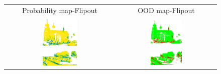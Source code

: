     \begin{figure}[h!]
        \centering
        \begin{tabular}{cc}
            Probability map-Flipout & OOD map-Flipout \\
            \includegraphics[width=0.33\textwidth, height=0.18\textheight]{images/ood_imgs/fout_sem3d/fout_prob_1.pdf}& 
            \includegraphics[width=0.33\textwidth, height=0.18\textheight]{images/ood_imgs/fout_sem3d/fout_ood_auroc_1.pdf}\\

            \includegraphics[width=0.33\textwidth, height=0.18\textheight]{images/ood_imgs/fout_sem3d/fout_prob_2.pdf}& 
            \includegraphics[width=0.33\textwidth, height=0.18\textheight]{images/ood_imgs/fout_sem3d/fout_ood_auroc_2.pdf}\\


\end{tabular}
\end{figure}
